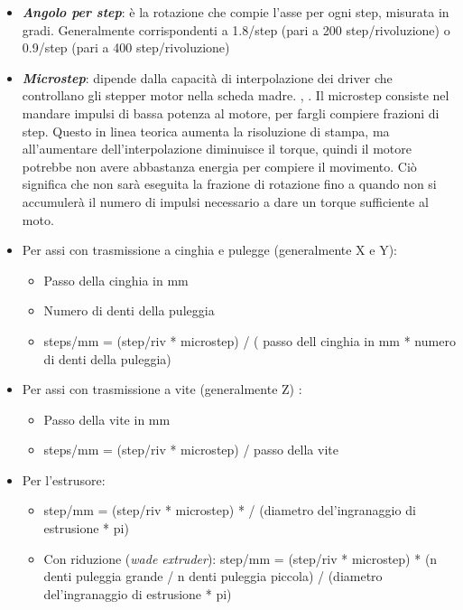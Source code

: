 \begin{itemize}
\item	\emph{\textbf{Angolo per step}}: è la rotazione che compie l'asse per ogni step, misurata in gradi. Generalmente corrispondenti a 1.8/step (pari a 200 step/rivoluzione) o 0.9/step (pari a 400 step/rivoluzione)
\item	\emph{\textbf{Microstep}}:  dipende dalla capacità di interpolazione dei driver che controllano gli stepper motor nella scheda madre. \parencite{Reference5}, \parencite{Reference6}. Il microstep consiste nel mandare impulsi di bassa potenza al motore, per fargli compiere frazioni di step. Questo in linea teorica aumenta la risoluzione di stampa, ma all'aumentare dell'interpolazione diminuisce il torque, quindi il motore potrebbe non avere abbastanza energia per compiere il movimento. Ciò significa che non sarà eseguita la frazione di rotazione fino a quando non si accumulerà il numero di impulsi necessario a dare un torque sufficiente al moto.
\item	Per assi con trasmissione a cinghia e pulegge (generalmente X e Y):

\begin{itemize}
\item	Passo della cinghia in mm
\item	Numero di denti della puleggia
\item	steps/mm =  (step/riv * microstep) / ( passo dell cinghia in mm * numero di denti della puleggia)
\end{itemize}

\item	Per assi con trasmissione a vite (generalmente Z) \parencite{Reference51}:

\begin{itemize}
\item	Passo della vite in mm
\item	steps/mm =  (step/riv * microstep) / passo della vite
\end{itemize}

\item	Per l'estrusore:

\begin{itemize}
\item 	step/mm = (step/riv * microstep) *  / (diametro del'ingranaggio di estrusione * pi)
\item 	Con riduzione (\emph{wade extruder}): step/mm = (step/riv * microstep) * (n denti puleggia grande / n denti puleggia piccola) / (diametro del'ingranaggio di estrusione * pi)
\end{itemize}

\end{itemize}
	

